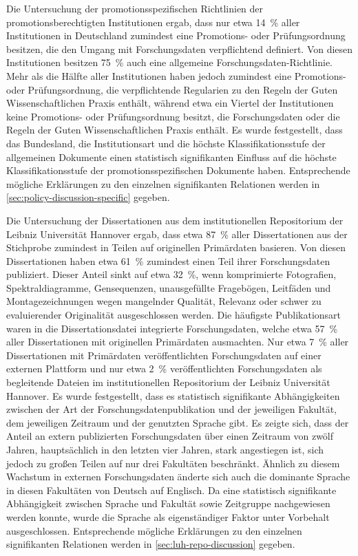 Die Untersuchung der promotionsspezifischen Richtlinien der promotionsberechtigten Institutionen ergab, dass nur etwa \SI{14}{\percent} aller Institutionen in Deutschland zumindest eine Promotions- oder Prüfungsordnung besitzen, die den Umgang mit Forschungsdaten verpflichtend definiert.
Von diesen Institutionen besitzen \SI{75}{\percent} auch eine allgemeine Forschungsdaten-Richtlinie.
Mehr als die Hälfte aller Institutionen haben jedoch zumindest eine Promotions- oder Prüfungsordnung, die verpflichtende Regularien zu den Regeln der Guten Wissenschaftlichen Praxis enthält, während etwa ein Viertel der Institutionen keine Promotions- oder Prüfungsordnung besitzt, die Forschungsdaten oder die Regeln der Guten Wissenschaftlichen Praxis enthält.
Es wurde festgestellt, dass das Bundesland, die Institutionsart und die höchste Klassifikationsstufe der allgemeinen Dokumente einen statistisch signifikanten Einfluss auf die höchste Klassifikationsstufe der promotionsspezifischen Dokumente haben.
Entsprechende mögliche Erklärungen zu den einzelnen signifikanten Relationen werden in \cref{sec:policy-discussion-specific} gegeben.

Die Untersuchung der Dissertationen aus dem institutionellen Repositorium der Leibniz Universität Hannover ergab, dass etwa \SI{87}{\percent} aller Dissertationen aus der Stichprobe zumindest in Teilen auf originellen Primärdaten basieren.
Von diesen Dissertationen haben etwa \SI{61}{\percent} zumindest einen Teil ihrer Forschungsdaten publiziert.
Dieser Anteil sinkt auf etwa \SI{32}{\percent}, wenn komprimierte Fotografien, Spektraldiagramme, Gensequenzen, unausgefüllte Fragebögen, Leitfäden und Montagezeichnungen wegen mangelnder Qualität, Relevanz oder schwer zu evaluierender Originalität ausgeschlossen werden.
Die häufigste Publikationsart waren in die Dissertationsdatei integrierte Forschungsdaten, welche etwa \SI{57}{\percent} aller Dissertationen mit originellen Primärdaten ausmachten.
Nur etwa \SI{7}{\percent} aller Dissertationen mit Primärdaten veröffentlichten Forschungsdaten auf einer externen Plattform und nur etwa \SI{2}{\percent} veröffentlichten Forschungsdaten als begleitende Dateien im institutionellen Repositorium der Leibniz Universität Hannover.
Es wurde festgestellt, dass es statistisch signifikante Abhängigkeiten zwischen der Art der Forschungsdatenpublikation und der jeweiligen Fakultät, dem jeweiligen Zeitraum und der genutzten Sprache gibt.
Es zeigte sich, dass der Anteil an extern publizierten Forschungsdaten über einen Zeitraum von zwölf Jahren, hauptsächlich in den letzten vier Jahren, stark angestiegen ist, sich jedoch zu großen Teilen auf nur drei Fakultäten beschränkt.
Ähnlich zu diesem Wachstum in externen Forschungsdaten änderte sich auch die dominante Sprache in diesen Fakultäten von Deutsch auf Englisch.
Da eine statistisch signifikante Abhängigkeit zwischen Sprache und Fakultät sowie Zeitgruppe nachgewiesen werden konnte, wurde die Sprache als eigenständiger Faktor unter Vorbehalt ausgeschlossen.
Entsprechende mögliche Erklärungen zu den einzelnen signifikanten Relationen werden in \cref{sec:luh-repo-discussion} gegeben.

